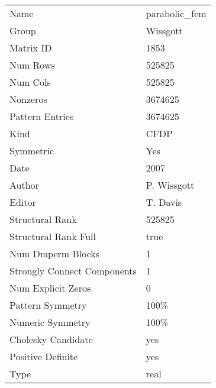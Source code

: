 \begin{tabular}{ll}
\midrule
                       Name &                        parabolic\_fem \\
                      Group &                             Wissgott \\
                  Matrix ID &                                 1853 \\
                   Num Rows &                               525825 \\
                   Num Cols &                               525825 \\
                   Nonzeros &                              3674625 \\
            Pattern Entries &                              3674625 \\
                       Kind & CFDP \\
                  Symmetric &                                  Yes \\
                       Date &                                 2007 \\
                     Author &                          P. Wissgott \\
                     Editor &                             T. Davis \\
            Structural Rank &                               525825 \\
       Structural Rank Full &                                 true \\
          Num Dmperm Blocks &                                    1 \\
Strongly Connect Components &                                    1 \\
         Num Explicit Zeros &                                    0 \\
           Pattern Symmetry &                                 100\% \\
           Numeric Symmetry &                                 100\% \\
         Cholesky Candidate &                                  yes \\
          Positive Definite &                                  yes \\
                       Type &                                 real \\
\bottomrule
\end{tabular}
